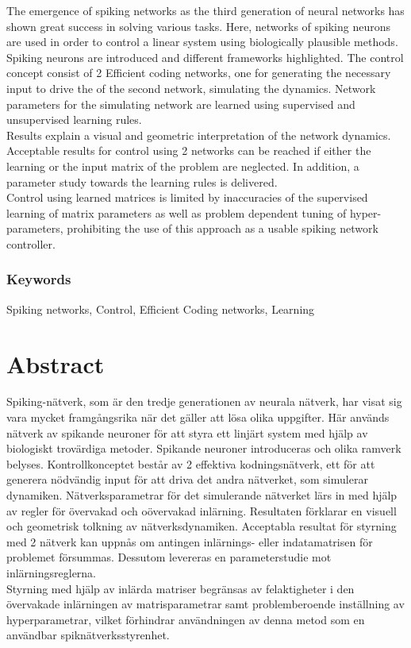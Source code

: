 
The emergence of spiking networks as the third generation of neural networks has shown great success in solving various tasks. Here, networks of spiking neurons are used in order to control a linear system using biologically plausible methods. Spiking neurons are introduced and different frameworks highlighted. The control concept consist of 2 Efficient coding networks, one for generating the necessary input to drive the of the second network, simulating the dynamics. Network parameters for the simulating network are learned using supervised and unsupervised learning rules.\\
Results explain a visual and geometric interpretation of the network dynamics. Acceptable results for control using 2 networks can be reached if either the learning or the input matrix of the problem are neglected. In addition, a parameter study towards the learning rules is delivered.\\
Control using learned matrices is limited by inaccuracies of the supervised learning of matrix parameters as well as problem dependent tuning of hyper-parameters, prohibiting the use of this approach as a usable spiking network controller.


\subsection*{Keywords}
Spiking networks, Control, Efficient Coding networks, Learning





\newpage
\thispagestyle{plain}
\chapter*{Abstract}
Spiking-nätverk, som är den tredje generationen av neurala nätverk, har visat sig vara mycket framgångsrika när det gäller att lösa olika uppgifter. Här används nätverk av spikande neuroner för att styra ett linjärt system med hjälp av biologiskt trovärdiga metoder. Spikande neuroner introduceras och olika ramverk belyses. Kontrollkonceptet består av 2 effektiva kodningsnätverk, ett för att generera nödvändig input för att driva det andra nätverket, som simulerar dynamiken. Nätverksparametrar för det simulerande nätverket lärs in med hjälp av regler för övervakad och oövervakad inlärning.
Resultaten förklarar en visuell och geometrisk tolkning av nätverksdynamiken. Acceptabla resultat för styrning med 2 nätverk kan uppnås om antingen inlärnings- eller indatamatrisen för problemet försummas. Dessutom levereras en parameterstudie mot inlärningsreglerna.\\
Styrning med hjälp av inlärda matriser begränsas av felaktigheter i den övervakade inlärningen av matrisparametrar samt problemberoende inställning av hyperparametrar, vilket förhindrar användningen av denna metod som en användbar spiknätverksstyrenhet.


